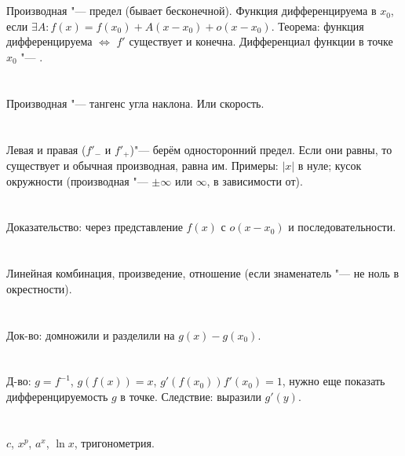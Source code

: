 \setcounter{section}{60}
\section{} %
Производная "--- предел (бывает бесконечной).
Функция дифференцируема в $x_0$, если $\exists A: f(x)=f(x_0)+A(x-x_0) + o(x-x_0)$.
Теорема: функция дифференцируема $\iff$ $f'$ существует и конечна.
Дифференциал функции в точке $x_0$ "--- \TODO.

\section{} %
Производная "--- тангенс угла наклона. Или скорость.

\section{} %
Левая и правая ($f'_-$ и $f'_+$)"--- берём односторонний предел. Если они равны,
то существует и обычная производная, равна им. Примеры: $|x|$ в нуле; кусок окружности
(производная "--- $\pm\infty$ или $\infty$, в зависимости от).

\section{} %
Доказательство: через представление $f(x)$ с $o(x-x_0)$ и последовательности.

\section{} %
Линейная комбинация, произведение, отношение (если знаменатель "--- не ноль в окрестности).

\section{} %
Док-во: домножили и разделили на $g(x)-g(x_0)$.

\section{} %
Д-во: $g=f^{-1}$, $g(f(x))=x$, $g'(f(x_0))f'(x_0)=1$, нужно еще показать дифференцируемость $g$ в точке.
Следствие: выразили $g'(y)$.

\section{} %
$c$, $x^p$, $a^x$, $\ln x$, тригонометрия.

